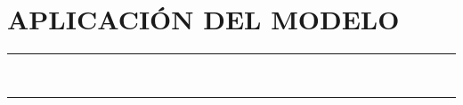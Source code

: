 \pagestyle{plain}
\chapter{APLICACIÓN DEL MODELO}\label{AplicacionModelo}
\vspace{0.2cm}
\noindent\rule{\linewidth}{1.5pt}\\
\startcontents[chapters]
\vspace{0.2cm}
\noindent\rule{\linewidth}{1.3pt}\\

\newpage


